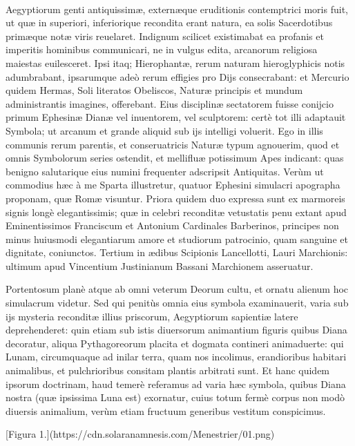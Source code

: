 \documentclass[a4paper, 11pt, oneside, polutonikogreek, latin]{article}
\begin{document}
\paragraph{}
Aegyptiorum genti antiquissimæ, externæque eruditionis contemptrici moris fuit, ut quæ in superiori, inferiorique recondita erant natura, ea solis Sacerdotibus primæque notæ viris reuelaret. Indignum scilicet existimabat ea profanis et imperitis hominibus communicari, ne in vulgus edita, arcanorum religiosa maiestas euilesceret. Ipsi itaq; Hierophantæ, rerum naturam hieroglyphicis notis adumbrabant, ipsarumque adeò rerum effigies pro Dijs consecrabant: et Mercurio quidem Hermas, Soli literatos Obeliscos, Naturæ principis et mundum administrantis imagines, offerebant. Eius disciplinæ sectatorem fuisse conijcio primum Ephesinæ Dianæ vel inuentorem, vel sculptorem: certè tot illi adaptauit Symbola; ut arcanum et grande aliquid sub ijs intelligi voluerit. Ego in illis communis rerum parentis, et conseruatricis Naturæ typum agnouerim, quod et omnis Symbolorum series ostendit, et mellifluæ potissimum Apes indicant: quas benigno salutarique eius numini frequenter adscripsit Antiquitas. Verùm ut commodius hæc à me Sparta illustretur, quatuor Ephesini simulacri apographa proponam, quæ Romæ visuntur. Priora quidem duo expressa sunt ex marmoreis signis longè elegantissimis; quæ in celebri reconditæ vetustatis penu extant apud Eminentissimos Franciscum et Antonium Cardinales Barberinos, principes non minus huiusmodi elegantiarum amore et studiorum patrocinio, quam sanguine et dignitate, coniunctos. Tertium in ædibus Scipionis Lancellotti, Lauri Marchionis: ultimum apud Vincentium Justinianum Bassani Marchionem asseruatur.

Portentosum planè atque ab omni veterum Deorum cultu, et ornatu alienum hoc simulacrum videtur. Sed qui penitùs omnia eius symbola examinauerit, varia sub ijs mysteria reconditæ illius priscorum, Aegyptiorum sapientiæ latere deprehenderet: quin etiam sub istis diuersorum animantium figuris quibus Diana decoratur, aliqua Pythagoreorum placita et dogmata contineri animaduerte: qui Lunam, circumquaque ad inilar terra, quam nos incolimus, erandioribus habitari animalibus, et pulchrioribus consitam plantis arbitrati sunt. Et hanc quidem ipsorum doctrinam, haud temerè referamus ad varia hæc symbola, quibus Diana nostra (quæ ipsissima Luna est) exornatur, cuius totum fermè corpus non modò diuersis animalium, verùm etiam fructuum generibus vestitum conspicimus.

[Figura 1.](https://cdn.solaranamnesis.com/Menestrier/01.png)
\end{document}
